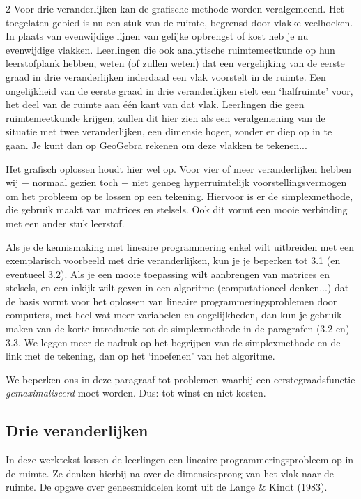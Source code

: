 \begin{multicols}{2}
	Voor drie veranderlijken kan de grafische methode worden veralgemeend. Het toegelaten gebied is nu een stuk van de ruimte, begrensd door vlakke veelhoeken. In plaats van evenwijdige lijnen van gelijke opbrengst of kost heb je nu evenwijdige vlakken. Leerlingen die ook analytische ruimtemeetkunde op hun leerstofplank hebben, weten (of zullen weten) dat een vergelijking van de eerste graad in drie veranderlijken inderdaad een vlak voorstelt in de ruimte. Een ongelijkheid van de eerste graad in drie veranderlijken stelt een `halfruimte' voor, het deel van de ruimte aan één kant van dat vlak. Leerlingen die geen ruimtemeetkunde krijgen, zullen dit hier zien als een veralgemening van de situatie met twee veranderlijken, een dimensie hoger, zonder er diep op in te gaan. Je kunt dan op GeoGebra rekenen om deze vlakken te tekenen... 
	
	Het grafisch oplossen houdt hier wel op. Voor vier of meer veranderlijken hebben wij $-$ normaal gezien toch $-$ niet genoeg hyperruimtelijk voorstellingsvermogen om het probleem op te lossen op een tekening. Hiervoor is er de simplexmethode, die gebruik maakt van matrices en stelsels. Ook dit vormt een mooie verbinding met een ander stuk leerstof. 
	
	Als je de kennismaking met lineaire programmering enkel wilt uitbreiden met een exemplarisch voorbeeld met drie veranderlijken, kun je je beperken tot 3.1 (en eventueel 3.2). Als je een mooie toepassing wilt aanbrengen van matrices en stelsels, en een inkijk wilt geven in een algoritme (computationeel denken...) dat de basis vormt voor het oplossen van lineaire programmeringsproblemen door computers, met heel wat meer variabelen en ongelijkheden, dan kun je gebruik maken van de korte introductie tot de simplexmethode in de paragrafen (3.2 en) 3.3. We leggen meer de nadruk op het begrijpen van de simplexmethode en de link met de tekening, dan op het `inoefenen' van het algoritme.
	
	We beperken ons in deze paragraaf tot problemen waarbij een eerstegraadsfunctie \emph{gemaximaliseerd} moet worden. Dus: tot winst en niet kosten.
	
\subsection{Drie veranderlijken}
	
	In deze werktekst lossen de leerlingen een lineaire programmeringsprobleem op in de ruimte. Ze denken hierbij na over de dimensiesprong van het vlak naar de ruimte. De opgave over geneesmiddelen komt uit de Lange \& Kindt (1983).
	
\end{multicols}

